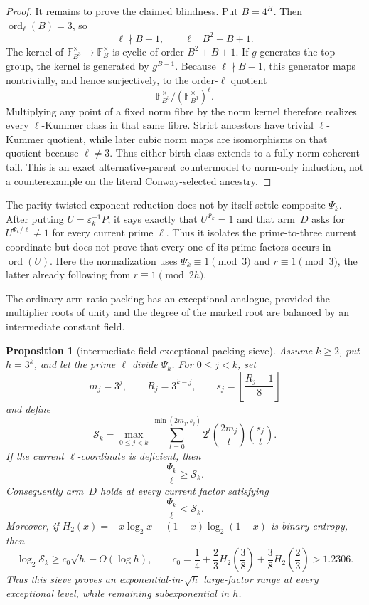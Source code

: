 \documentclass[11pt]{article}
\newtheorem{proposition}[theorem]{Proposition}
\theoremstyle{definition}
\theoremstyle{remark}
\begin{document}
\begin{proof}
It remains to prove the claimed blindness.  Put $B=4^H$.  Then
$\operatorname{ord}_\ell(B)=3$, so
\[
 \ell\nmid B-1,
 \qquad \ell\mid B^2+B+1.
\]
The kernel of
$\mathbb F_{B^3}^\times\to\mathbb F_B^\times$ is cyclic of order
$B^2+B+1$.  If $g$ generates the top group, the kernel is generated by
$g^{B-1}$.  Because $\ell\nmid B-1$, this generator maps nontrivially, and
hence surjectively, to the order-$\ell$ quotient
\[
 \mathbb F_{B^3}^\times/
       (\mathbb F_{B^3}^\times)^\ell.
\]
Multiplying any point of a fixed norm fibre by the norm kernel therefore
realizes every $\ell$-Kummer class in that same fibre.  Strict ancestors
have trivial $\ell$-Kummer quotient, while later cubic norm maps are
isomorphisms on that quotient because $\ell\ne3$.  Thus either birth class
extends to a fully norm-coherent tail.  This is an exact alternative-parent
countermodel to norm-only induction, not a counterexample on the literal
Conway-selected ancestry.
\end{proof}

The parity-twisted exponent reduction does not by itself settle composite
$\Psi_k$.  After putting $U=\varepsilon_k^{-1}P$, it says exactly that
$U^{\Psi_k}=1$ and that arm~$D$ asks for
$U^{\Psi_k/\ell}\ne1$ for every current prime $\ell$.  Thus it isolates the
prime-to-three current coordinate but does not prove that every one of its
prime factors occurs in $\operatorname{ord}(U)$.  Here the normalization uses
$\Psi_k\equiv1\pmod3$ and $r\equiv1\pmod3$, the latter already following from
$r\equiv1\pmod {2h}$.

The ordinary-arm ratio packing has an exceptional analogue, provided the
multiplier roots of unity and the degree of the marked root are balanced by
an intermediate constant field.

\begin{proposition}[intermediate-field exceptional packing sieve]
\label{prop:d-packing}
Assume $k\geq2$, put $h=3^k$, and let the prime $\ell$ divide $\Psi_k$.
For $0\leq j<k$, set
\[
 m_j=3^j,\qquad R_j=3^{k-j},\qquad
 s_j=\left\lfloor\frac{R_j-1}{8}\right\rfloor
\]
and define
\[
 \mathcal S_k=
 \max_{0\leq j<k}
 \sum_{t=0}^{\min(2m_j,s_j)}
 2^t\binom{2m_j}{t}\binom{s_j}{t}.
\]
If the current $\ell$-coordinate is deficient, then
\[
 \frac{\Psi_k}{\ell}\geq\mathcal S_k.
\]
Consequently arm~$D$ holds at every current factor satisfying
\[
 \frac{\Psi_k}{\ell}<\mathcal S_k.
\]
Moreover, if $H_2(x)=-x\log_2x-(1-x)\log_2(1-x)$ is binary entropy, then
\[
 \log_2\mathcal S_k
 \geq c_0\sqrt h-O(\log h),
 \qquad
 c_0=\frac14+\frac23H_2\!\left(\frac38\right)
              +\frac38H_2\!\left(\frac23\right)
 >1.2306.
\]
Thus this sieve proves an exponential-in-$\sqrt h$ large-factor range at
every exceptional level, while remaining subexponential in $h$.
\end{proposition}
\end{document}
